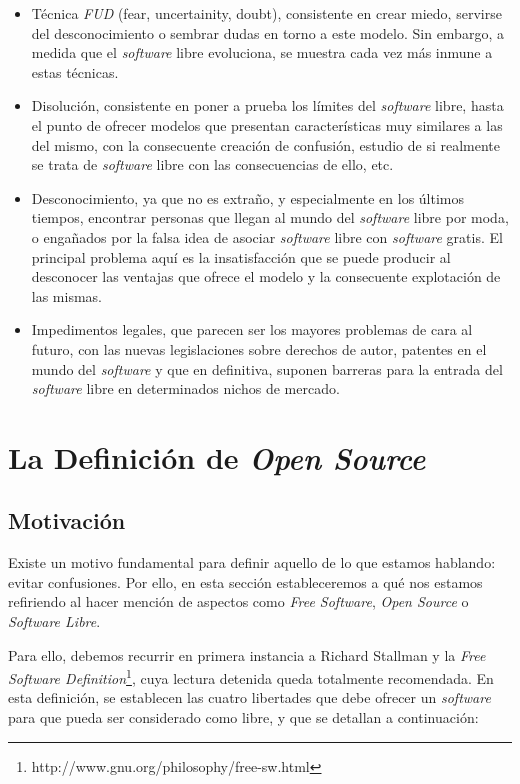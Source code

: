 \begin{itemize}
  \item Técnica \textit{FUD} (fear, uncertainity, doubt), consistente en crear
miedo, servirse del desconocimiento o sembrar dudas en torno a este modelo. Sin
embargo, a medida que el \textit{software} libre evoluciona, se muestra cada vez
más inmune a estas técnicas.
  \item Disolución, consistente en poner a prueba los límites del
\textit{software} libre, hasta el punto de ofrecer modelos que presentan
características muy similares a las del mismo, con la consecuente creación de
confusión, estudio de si realmente se trata de \textit{software} libre con las
consecuencias de ello, etc.
  \item Desconocimiento, ya que no es extraño, y especialmente en los últimos
tiempos, encontrar personas que llegan al mundo del \textit{software} libre por
moda, o engañados por la falsa idea de asociar \textit{software} libre con
\textit{software} gratis. El principal problema aquí es la insatisfacción que se
puede producir al desconocer las ventajas que ofrece el modelo y la consecuente
explotación de las mismas.
  \item Impedimentos legales, que parecen ser los mayores problemas de cara al
futuro, con las nuevas legislaciones sobre derechos de autor, patentes en el
mundo del \textit{software} y que en definitiva, suponen barreras para la
entrada del \textit{software} libre en determinados nichos de mercado.
\end{itemize}

\section{La Definición de \textit{Open Source}}

\subsection{Motivación}
\label{SUBSEC:DefinicionMotivacion}

Existe un motivo fundamental para definir aquello de lo que estamos hablando:
evitar confusiones. Por ello, en esta sección estableceremos a qué nos estamos
refiriendo al hacer mención de aspectos como \textit{Free Software},
\textit{Open Source} o \textit{Software Libre}.

Para ello, debemos recurrir en primera instancia a Richard Stallman y la
\textit{Free
Software Definition}\footnote{http://www.gnu.org/philosophy/free-sw.html}, cuya
lectura detenida queda totalmente recomendada. En esta definición, se establecen
las cuatro libertades que debe ofrecer un \textit{software} para que pueda ser
considerado como libre, y que se detallan a continuación:

